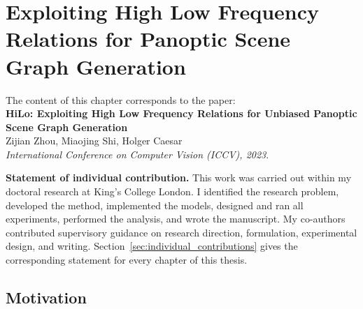 \chapter{Exploiting High Low Frequency Relations for Panoptic Scene Graph Generation}

\begin{tcolorbox}[
    breakable,
    colback=gray!5,
    colframe=black,
]
The content of this chapter corresponds to the paper: \\
\noindent \textbf{HiLo: Exploiting High Low Frequency Relations for Unbiased Panoptic Scene Graph Generation} \\
\noindent Zijian Zhou, Miaojing Shi, Holger Caesar \\
\noindent \textit{International Conference on Computer Vision (ICCV), 2023}.

\vspace{0.6em}
\noindent \textbf{Statement of individual contribution.}
This work was carried out within my doctoral research at King's College London. I identified the research problem, developed the method, implemented the models, designed and ran all experiments, performed the analysis, and wrote the manuscript. My co-authors contributed supervisory guidance on research direction, formulation, experimental design, and writing. Section~\ref{sec:individual_contributions} gives the corresponding statement for every chapter of this thesis.
\end{tcolorbox}

\section{Motivation}







